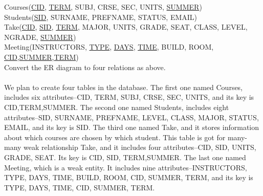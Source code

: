 Courses(\underline{CID}, \underline{TERM}, SUBJ, CRSE, SEC, UNITS, \underline{SUMMER})\\
Students(\underline{SID}, SURNAME, PREFNAME, STATUS, EMAIL)\\
Take(\underline{CID}, \underline{SID}, \underline{TERM}, MAJOR, UNITS, GRADE, SEAT, CLASS, LEVEL, NGRADE, \underline{SUMMER})\\
Meeting(INSTRUCTORS, \underline{TYPE}, \underline{DAYS}, \underline{TIME}, BUILD, ROOM, \underline{CID},\underline{SUMMER},\underline{TERM})\\

Convert the ER diagram to four relations as above.\\\\ 
We plan to create four tables in the database. The first one named Courses, includes six attributes--CID, TERM, SUBJ, CRSE, SEC, UNITS, and its key is {CID,TERM,SUMMER}. The second one named Students, includes eight attributes--SID, SURNAME, PREFNAME, LEVEL, CLASS, MAJOR, STATUS, EMAIL, and its key is SID. The third one named Take, and it stores information about which courses are chosen by which student. This table is got for many-many weak relationship Take, and it includes four attributes--CID, SID, UNITS, GRADE, SEAT. Its key is {CID, SID, TERM,SUMMER}. The last one named Meeting, which is a weak entity. It includes nine attributes--INSTRUCTORS, TYPE, DAYS, TIME, BUILD, ROOM, CID, SUMMER, TERM, and its key is {TYPE, DAYS, TIME, CID, SUMMER, TERM}.    